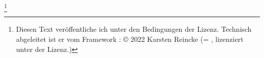 \footnote{Diesen Text veröffentliche ich unter den Bedingungen der  Lizenz. Technisch abgeleitet ist er vom Framework : \copyright{} 2022 Karsten Reincke (= , lizenziert unter der  Lizenz.)}

